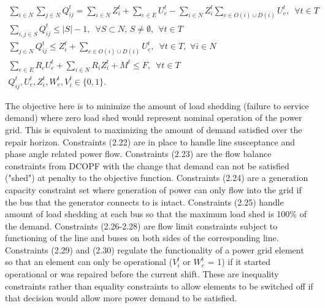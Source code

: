 \begin{eqnarray}
\sum_{i \in N} \sum_{j \in N} Q_{ij}^{t} = \sum_{i \in N} Z_i^t + \sum_{e \in E} U_e^t - \sum_{i \in N} Z_i^t \sum_{e \in O(i) \cup D(i)} U_e^t, \hspace{6pt} \forall t \in T\\
\sum_{i,j \in S} Q_{ij}^t \leq |S|-1, \hspace{6pt} \forall S \subset N, \hspace{2pt} S \neq \emptyset, \hspace{5pt} \forall t\in T \\
\sum_{j \in N} Q_{ij}^t \leq Z_i^t + \sum_{e \in O(i) \cup D(i)} U_{e}^t, \hspace{6pt} \forall t \in T, \hspace{4pt} \forall i \in N \\
\sum_{e \in E} R_{e}U_e^t + \sum_{i \in N}R_{i}Z_i^t + M^t \leq F, \hspace{6pt} \forall t \in T\\
Q_{ij}^t,U_{e}^t,Z_{i}^t,W_{e}^t,V_{i}^t \in \{0,1\}. 
\end{eqnarray}

The objective here is to minimize the amount of load shedding (failure to service demand) where zero load shed would represent nominal operation of the power grid. This is equivalent to maximizing the amount of demand satisfied over the repair horizon. Constraints (2.22) are in place to handle line susceptance and phase angle related power flow. Constraints (2.23) are the flow balance constraints from DCOPF with the change that demand can not be satisfied ("shed") at penalty to the objective function. Constraints (2.24) are a generation capacity constraint set where generation of power can only flow into the grid if the bus that the generator connects to is intact. Constraints (2.25) handle amount of load shedding at each bus so that the maximum load shed is 100\% of the demand. Constraints (2.26-2.28) are flow limit constraints subject to functioning of the line and buses on both sides of the corresponding line. Constraints (2.29) and (2.30) regulate the functionality of a power grid element so that an element can only be operational ($V_i^t$ or $W_e^t$ = 1) if it started operational or was repaired before the current shift. These are inequality constraints rather than equality constraints to allow elements to be switched off if that decision would allow more power demand to be satisfied.

